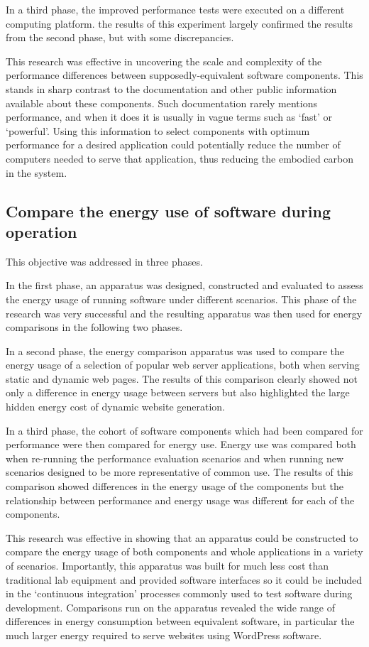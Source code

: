 In a third phase, the improved performance tests were executed on a different computing platform. the results of this experiment largely confirmed the results from the second phase, but with some discrepancies.

This research was effective in uncovering the scale and complexity of the performance differences between supposedly-equivalent software components. This stands in sharp contrast to the documentation and other public information available about these components. Such documentation rarely mentions performance, and when it does it is usually in vague terms such as `fast' or `powerful'. Using this information to select components with optimum performance for a desired application could potentially reduce the number of computers needed to serve that application, thus reducing the embodied carbon in the system.

\subsection{Compare the energy use of software during operation}

This objective was addressed in three phases.

In the first phase, an apparatus was designed, constructed and evaluated to assess the energy usage of running software under different scenarios. This phase of the research was very successful and the resulting apparatus was then used for energy comparisons in the following two phases.

In a second phase, the energy comparison apparatus was used to compare the energy usage of a selection of popular web server applications, both when serving static and dynamic web pages. The results of this comparison clearly showed not only a difference in energy usage between servers but also highlighted the large hidden energy cost of dynamic website generation.

In a third phase, the cohort of software components which had been compared for performance were then compared for energy use. Energy use was compared both when re-running the performance evaluation scenarios and when running new scenarios designed to be more representative of common use. The results of this comparison showed differences in the energy usage of the components but the relationship between performance and energy usage was different for each of the components.

This research was effective in showing that an apparatus could be constructed to compare the energy usage of both components and whole applications in a variety of scenarios. Importantly, this apparatus was built for much less cost than traditional lab equipment and provided software interfaces so it could be included in the `continuous integration' processes commonly used to test software during development. Comparisons run on the apparatus revealed the wide range of differences in energy consumption between equivalent software, in particular the much larger energy required to serve websites using WordPress software.

